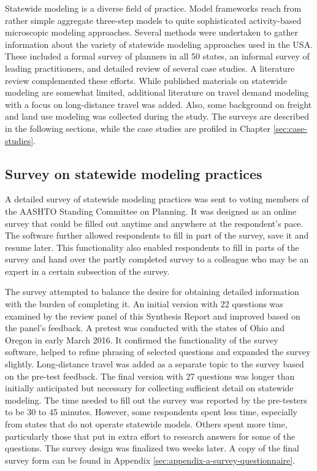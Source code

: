Statewide modeling is a diverse field of practice. Model frameworks reach from rather simple aggregate three-step models to quite sophisticated activity-based microscopic modeling approaches. Several methods were undertaken to gather information about the variety of statewide modeling approaches used in the USA. These included a formal survey of planners in all 50 states, an informal survey of leading practitioners, and detailed review of several case studies. A literature review complemented these efforts. While published materials on statewide modeling are somewhat limited, additional literature on travel demand modeling with a focus on long-distance travel was added. Also, some background on freight and land use modeling was collected during the study. The surveys are described in the following sections, while the case studies are profiled in Chapter \ref{sec:case-studies}.

\subsection{Survey on statewide modeling practices}

A detailed survey of statewide modeling practices was sent to voting members of the AASHTO Standing Committee on Planning. It was designed as an online survey that could be filled out anytime and anywhere at the respondent's pace. The software further allowed respondents to fill in part of the survey, save it and resume later. This functionality also enabled respondents to fill in parts of the survey and hand over the partly completed survey to a colleague who may be an expert in a certain subsection of the survey.

The survey attempted to balance the desire for obtaining detailed information with the burden of completing it. An initial version with 22 questions was examined by the review panel of this Synthesis Report and improved based on the panel's feedback. A pretest was conducted with the states of Ohio and Oregon in early March 2016. It confirmed the functionality of the survey software, helped to refine phrasing of selected questions and expanded the survey slightly. Long-distance travel was added as a separate topic to the survey based on the pre-test feedback. The final version with 27 questions was longer than initially anticipated but necessary for collecting sufficient detail on statewide modeling. The time needed to fill out the survey was reported by the pre-testers to be 30 to 45 minutes. However, some respondents spent less time, especially from states that do not operate statewide models. Others spent more time, particularly those that put in extra effort to research answers for some of the questions. The survey design was finalized two weeks later. A copy of the final survey form can be found in Appendix \ref{sec:appendix-a-survey-questionnaire}.

